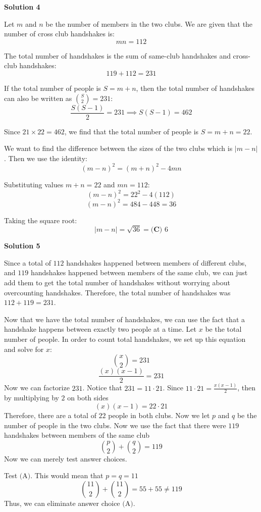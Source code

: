 \begin{enumerate}
 



\textbf{Solution 4}

Let $m$ and $n$ be the number of members in the two clubs. We are given that the number of cross club handshakes is:
 \[mn = 112\]

 The total number of handshakes is the sum of same-club handshakes and cross-club handshakes:
 \[119 + 112 = 231\]

 If the total number of people is $S = m+n$, then the total number of handshakes can also be written as $\binom{S}{2} = 231$:
 \[\frac{S(S-1)}{2} = 231 \implies S(S-1) = 462\]

 Since $21 \times 22 = 462$, we find that the total number of people is $S = m+n = 22$. 

 We want to find the difference between the sizes of the two clubs which is $|m-n|$. Then we use the identity:
 \[(m-n)^2 = (m+n)^2 - 4mn\]

 Substituting values $m+n = 22$ and $mn = 112$:
 \[(m-n)^2 = 22^2 - 4(112)\]
 \[(m-n)^2 = 484 - 448 = 36\]

 Taking the square root:
 \[|m-n| = \sqrt{36} = \boxed{\textbf{(C) } 6}\]




\textbf{Solution 5}

Since a total of $112$ handshakes happened between members of different clubs, and $119$ handshakes happened between members of the same club, we can just add them to get the total number of handshakes without worrying about overcounting handshakes. Therefore, the total number of handshakes was $112+119=231$. 

 Now that we have the total number of handshakes, we can use the fact that a handshake happens between exactly two people at a time. Let $x$ be the total number of people. In order to count total handshakes, we set up this equation and solve for $x$:
 \[{x\choose 2}=231\]
 \[\frac{(x)(x-1)}{2}=231\]Now we can factorize $231$. Notice that $231=11 \cdot 21$. Since $11 \cdot 21 = \frac{x(x-1)}{2}$, then by multiplying by $2$ on both sides
 \[(x)(x-1)=22 \cdot 21\]Therefore, there are a total of $22$ people in both clubs. Now we let $p$ and $q$ be the number of people in the two clubs. Now we use the fact that there were $119$ handshakes between members of the same club
 \[{p\choose2}+{q\choose2}=119\]Now we can merely test answer choices.

 Test $\text{(A)}$. This would mean that $p=q=11$
 \[{11\choose2}+{11\choose2}=55+55 \neq 119\]Thus, we can eliminate answer choice $\text{(A)}$.


\end{enumerate}
